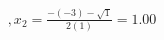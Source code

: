 \documentclass[preview]{standalone}
\begin{document}
\begin{align*}
, x_2 = \frac{-(-3) - \sqrt{1}}{2(1)} = 1.00
\end{align*}
\end{document}
